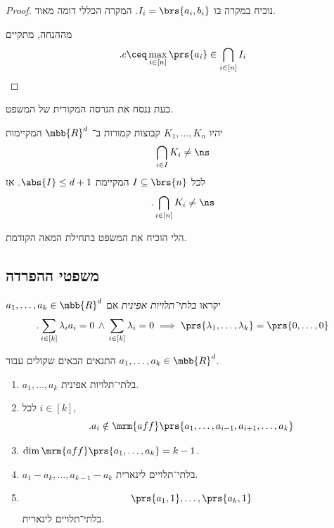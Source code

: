 \documentclass[a4paper,10pt,twoside,openany]{book}
\begin{document}
\begin{proof}
נוכיח במקרה בו
$I_i = \brs{a_i, b_i}$.
המקרה הכללי דומה מאוד.

מההנחה, מתקיים
\[\text{.} c \ceq \max_{i \in [n]} \prs{a_i} \in \bigcap_{i \in [n]} I_i\]
\end{proof}

כעת ננסח את הגרסה המקורית של המשפט.

\begin{theorem}
יהיו
$K_1, \ldots, K_n$
קבוצות קמורות ב־%
$\mbb{R}^d$
המקיימות
\[\bigcap_{i \in I} K_i \neq \ns\]
לכל
$I \subseteq \brs{n}$
המקיימת
$\abs{I} \leq d + 1$.
אז
\[\text{.} \bigcap_{i \in [n]} K_i \neq \ns\]
\end{theorem}

הלי הוכיח את המשפט בתחילת המאה הקודמת.


\subsection{משפטי ההפרדה}

\begin{definition}[]
$a_1, \ldots, a_k \in \mbb{R}^d$
יקראו
\emph{בלתי־תלויות אפינית}
אם
\[\text{.} \sum_{i \in [k]} \lambda_i a_i =0 \, \wedge \, \sum_{i \in [k]} \lambda_i = 0 \implies \prs{\lambda_1,\ldots, \lambda_k} = \prs{0, \ldots, 0}\]
\end{definition}

\begin{proposition}
התנאים הבאים שקולים עבור
$a_1, \ldots, a_k \in \mbb{R}^d$.

\begin{enumerate}
\item $a_1,\ldots,a_k$
בלתי־תלויות אפינית.
\item לכל
$i \in [k]$,
\[\text{.} a_i \notin \mrm{aff}\prs{a_1, \ldots, a_{i-1}, a_{i+1}, \ldots, a_k}\]
\item $\dim \mrm{aff}\prs{a_1, \ldots, a_k} = k-1$.
\item $a_1 - a_k, \ldots, a_{k-1}-a_k$
בלתי־תלויים לינארית.
\item \[\prs{a_1, 1}, \ldots, \prs{a_k, 1}\]
בלתי־תלויים לינארית.
\end{enumerate}
\end{proposition}
\end{document}
